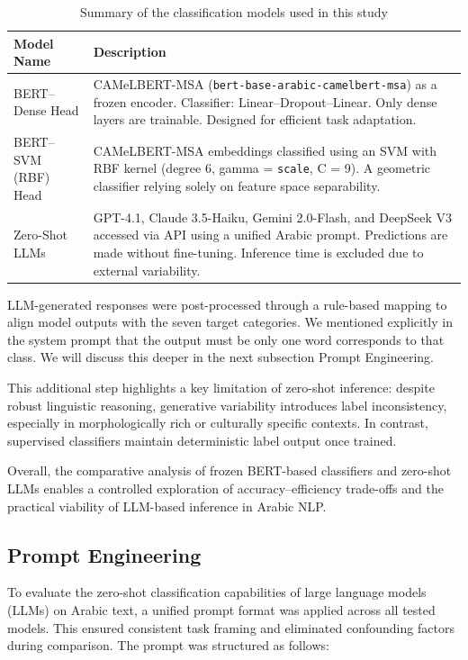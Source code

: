 \documentclass[sn-mathphys-num]{sn-jnl}
\begin{document}
\begin{table}[!ht]
\centering
\caption{Summary of the classification models used in this study}
\label{tab:models_summary}
\small
\begin{tabular}{@{}>{\raggedright\arraybackslash}p{3.5cm} >{\raggedright\arraybackslash}p{8cm}@{}}
\hline
\textbf{Model Name} & \textbf{Description} \\
\hline
BERT–Dense Head & CAMeLBERT-MSA (\texttt{bert-base-arabic-camelbert-msa}) as a frozen encoder. Classifier: Linear–Dropout–Linear. Only dense layers are trainable. Designed for efficient task adaptation. \\
BERT–SVM (RBF) Head & CAMeLBERT-MSA embeddings classified using an SVM with RBF kernel (degree 6, gamma = \texttt{scale}, C = 9). A geometric classifier relying solely on feature space separability. \\
Zero-Shot LLMs & GPT-4.1, Claude 3.5-Haiku, Gemini 2.0-Flash, and DeepSeek V3 accessed via API using a unified Arabic prompt. Predictions are made without fine-tuning. Inference time is excluded due to external variability. \\
\hline
\end{tabular}
\end{table}

\noindent
LLM-generated responses were post-processed through a rule-based mapping to align model outputs with the seven target categories. We mentioned explicitly in the system prompt that the output must be only one word corresponds to that class. We will discuss this deeper in the next subsection Prompt Engineering. 

This additional step highlights a key limitation of zero-shot inference: despite robust linguistic reasoning, generative variability introduces label inconsistency, especially in morphologically rich or culturally specific contexts. In contrast, supervised classifiers maintain deterministic label output once trained.

Overall, the comparative analysis of frozen BERT-based classifiers and zero-shot LLMs enables a controlled exploration of accuracy–efficiency trade-offs and the practical viability of LLM-based inference in Arabic NLP.

\subsection{Prompt Engineering}

To evaluate the zero-shot classification capabilities of large language models (LLMs) on Arabic text, a unified prompt format was applied across all tested models. This ensured consistent task framing and eliminated confounding factors during comparison. The prompt was structured as follows:
\end{document}
